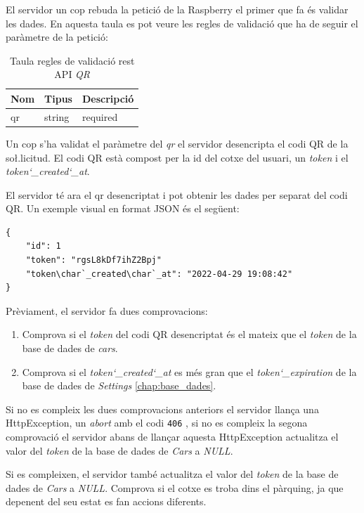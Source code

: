 El servidor un cop rebuda la petició de la Raspberry el primer que fa és validar les dades.
En aquesta taula es pot veure les regles de validació que ha de seguir el paràmetre
de la petició:

\begin{table}[H]
\centering
\begin{tabular}{lll}
\hline
\textbf{Nom} & \textbf{Tipus} & \textbf{Descripció} \\ \hline
qr              & string       &  required     \\ \hline
\end{tabular}
\caption{Taula regles de validació rest API \emph{QR}}
\label{tab:my-cars-api-table}
\end{table}

Un cop s'ha validat el paràmetre del \emph{qr} el servidor desencripta el codi QR
de la so\l.licitud. El codi QR està compost per la id del cotxe del usuari, un \emph{token}
i el \emph{token\char`_created\char`_at}.

El servidor té ara el qr desencriptat i pot obtenir les dades per separat del codi QR.
Un exemple visual en format JSON és el següent:

\begin{verbatim}
{
    "id": 1
    "token": "rgsL8kDf7ihZ2Bpj"
    "token\char`_created\char`_at": "2022-04-29 19:08:42"
}
\end{verbatim}

Prèviament, el servidor fa dues comprovacions:
\begin{enumerate}
    \item Comprova si el \emph{token} del codi QR desencriptat és el mateix que el \emph{token} de la base de dades de \emph{cars}.
    \item Comprova si el \emph{token\char`_created\char`_at} es més gran que el \emph{token\char`_expiration}
    de la base de dades de \emph{Settings} \autoref{chap:base_dades}.
\end{enumerate}

Si no es compleix les dues comprovacions anteriors el servidor llança una HttpException,
un \emph{abort} amb el codi \texttt{406} \autocite{http_406_response}, si no es compleix la segona comprovació
el servidor abans de llançar aquesta HttpException actualitza el valor del \emph{token} de la base de dades de
\emph{Cars} a \emph{NULL}.

Si es compleixen, el servidor també actualitza el valor del \emph{token} de la base de dades de
\emph{Cars} a \emph{NULL}. Comprova si el cotxe es troba dins el pàrquing, ja que depenent del seu
estat es fan accions diferents.

